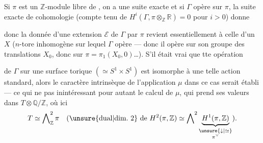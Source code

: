 Si \(\pi\) est un \(\mathbb Z\)-module libre de
, on a une suite exacte
et si \(\Gamma\) opère sur \(\pi\), la suite exacte de cohomologie
(compte tenu de \(H^i(\Gamma,\pi\otimes_{\mathbb Z}\mathbb R)=0\)
pour \(i>0\)) donne

donc la donnée d'une extension \(\mathcal E\) de \(\Gamma\) par \(\pi\)
revient essentiellement à celle d'un
 \(X\)
(\(n\)-tore inhomogène sur lequel \(\Gamma\) opère --- donc il opère
sur son groupe des translations \(X_0\), donc sur
\(\pi=\pi_1(X_0,0)\)\ldots).
S'il était vrai  que tte opération



de \(\Gamma\) sur une surface torique \((\simeq S^1\times S^1)\)
est isomorphe à une telle action standard, alors le caractère
intrinsèque de l'application \(\mu\) dans ce cas serait établi
--- ce qui ne  pas inintéressant pour autant le calcul
de \(\mu\), qui prend ses valeurs dans
\(T\otimes\mathbb Q/\mathbb Z\), où ici
\[
T\simeq\bigwedge\nolimits_{\mathbb Z}^{2}\pi
\quad
(\text{\unsure{dual|dim.\ 2} de }H^2(\pi,\mathbb Z)\simeq
\bigwedge\nolimits^{2}
\underbrace{H^1(\pi,\mathbb Z)}_{
\substack{\unsure{\downarrow|\simeq}\\ \pi^\vee}}).
\]


